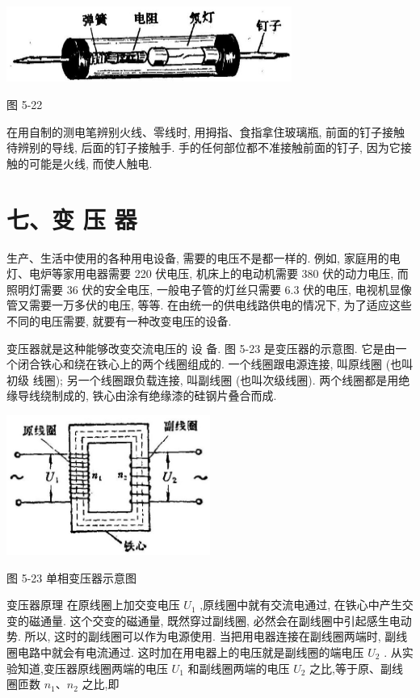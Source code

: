 \documentclass[10pt]{article}
\begin{document}
\begin{center}
\includegraphics[max width=0.7\textwidth]{images/01913056-1f15-74d8-9184-9aab52c9d66b_179_416867.jpg}
\end{center}

图 5-22

在用自制的测电笔辨别火线、零线时, 用拇指、食指拿住玻璃瓶, 前面的钉子接触待辨别的导线, 后面的钉子接触手. 手的任何部位都不准接触前面的钉子, 因为它接触的可能是火线, 而使人触电.

\section*{七、变 压 器}

生产、生活中使用的各种用电设备, 需要的电压不是都一样的. 例如, 家庭用的电灯、电炉等家用电器需要 220 伏电压, 机床上的电动机需要 380 伏的动力电压, 而照明灯需要 36 伏的安全电压, 一般电子管的灯丝只需要 6.3 伏的电压, 电视机显像管又需要一万多伏的电压, 等等. 在由统一的供电线路供电的情况下, 为了适应这些不同的电压需要, 就要有一种改变电压的设备.

变压器就是这种能够改变交流电压的 设 备. 图 5-23 是变压器的示意图. 它是由一个闭合铁心和绕在铁心上的两个线圈组成的. 一个线圈跟电源连接, 叫原线圈 (也叫初级 线圈); 另一个线圈跟负载连接, 叫副线圈 (也叫次级线圈). 两个线圈都是用绝缘导线绕制成的, 铁心由涂有绝缘漆的硅钢片叠合而成.

\begin{center}
\includegraphics[max width=0.5\textwidth]{images/01913056-1f15-74d8-9184-9aab52c9d66b_180_892251.jpg}
\end{center}

图 5-23 单相变压器示意图

变压器原理 在原线圈上加交变电压 \({U}_{1}\) ,原线圈中就有交流电通过, 在铁心中产生交变的磁通量. 这个交变的磁通量, 既然穿过副线圈, 必然会在副线圈中引起感生电动势. 所以, 这时的副线圈可以作为电源使用. 当把用电器连接在副线圈两端时, 副线圈电路中就会有电流通过. 这时加在用电器上的电压就是副线圈的端电压 \({U}_{2}\) . 从实验知道,变压器原线圈两端的电压 \({U}_{1}\) 和副线圈两端的电压 \({U}_{2}\) 之比,等于原、副线圈匝数 \({n}_{1}\text{、}{n}_{2}\) 之比,即
\end{document}
